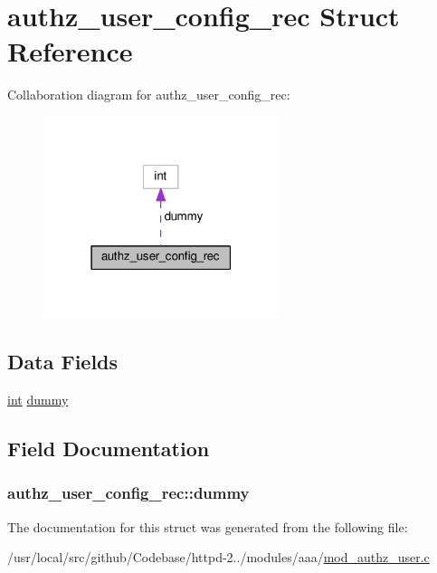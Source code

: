 \hypertarget{structauthz__user__config__rec}{}\section{authz\+\_\+user\+\_\+config\+\_\+rec Struct Reference}
\label{structauthz__user__config__rec}


Collaboration diagram for authz\+\_\+user\+\_\+config\+\_\+rec\+:
\nopagebreak
\begin{figure}[H]
\begin{center}
\leavevmode
\includegraphics[width=195pt]{structauthz__user__config__rec__coll__graph}
\end{center}
\end{figure}
\subsection*{Data Fields}
\begin{DoxyCompactItemize}
\item 
\hyperlink{pcre_8txt_a42dfa4ff673c82d8efe7144098fbc198}{int} \hyperlink{structauthz__user__config__rec_adb005be6d672e75e4ca76701d3346a63}{dummy}
\end{DoxyCompactItemize}


\subsection{Field Documentation}
\subsubsection[{\texorpdfstring{dummy}{dummy}}]{ authz\+\_\+user\+\_\+config\+\_\+rec\+::dummy}\hypertarget{structauthz__user__config__rec_adb005be6d672e75e4ca76701d3346a63}{}\label{structauthz__user__config__rec_adb005be6d672e75e4ca76701d3346a63}


The documentation for this struct was generated from the following file\+:\begin{DoxyCompactItemize}
\item 
/usr/local/src/github/\+Codebase/httpd-\/2../modules/aaa/\hyperlink{mod__authz__user_8c}{mod\+\_\+authz\+\_\+user.\+c}\end{DoxyCompactItemize}
